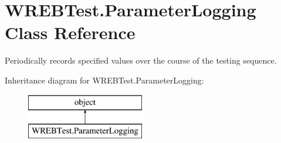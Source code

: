 \hypertarget{class_w_r_e_b_test_1_1_parameter_logging}{}\section{W\+R\+E\+B\+Test.\+Parameter\+Logging Class Reference}
\label{class_w_r_e_b_test_1_1_parameter_logging}


Periodically records specified values over the course of the testing sequence.  


Inheritance diagram for W\+R\+E\+B\+Test.\+Parameter\+Logging\+:\begin{figure}[H]
\begin{center}
\leavevmode
\includegraphics[height=2.000000cm]{class_w_r_e_b_test_1_1_parameter_logging}
\end{center}
\end{figure}
